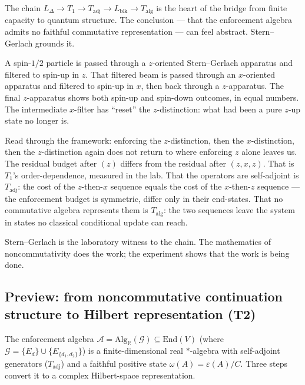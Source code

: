 \documentclass[11pt]{article}
\theoremstyle{remark}
\begin{document}
\begin{tcolorbox}[apfbox, title={The physical grounding: Stern--Gerlach and the order of enforcement}]
The chain $L_\Delta \to T_1 \to T_{\mathrm{adj}} \to L_{\mathrm{blk}} \to T_{\mathrm{alg}}$ is the heart of the bridge from finite capacity to quantum structure.  The conclusion --- that the enforcement algebra admits no faithful commutative representation --- can feel abstract.  Stern--Gerlach grounds it.

\smallskip\noindent A spin-$1/2$ particle is passed through a $z$-oriented Stern--Gerlach apparatus and filtered to spin-up in $z$.  That filtered beam is passed through an $x$-oriented apparatus and filtered to spin-up in $x$, then back through a $z$-apparatus.  The final $z$-apparatus shows both spin-up and spin-down outcomes, in equal numbers.  The intermediate $x$-filter has ``reset'' the $z$-distinction: what had been a pure $z$-up state no longer is.

\smallskip\noindent Read through the framework: enforcing the $z$-distinction, then the $x$-distinction, then the $z$-distinction again does not return to where enforcing $z$ alone leaves us.  The residual budget after $(z)$ differs from the residual after $(z, x, z)$.  That is $T_1$'s order-dependence, measured in the lab.  That the operators are self-adjoint is $T_{\mathrm{adj}}$: the cost of the $z$-then-$x$ sequence equals the cost of the $x$-then-$z$ sequence --- the enforcement budget is symmetric, differ only in their end-states.  That no commutative algebra represents them is $T_{\mathrm{alg}}$: the two sequences leave the system in states no classical conditional update can reach.

\smallskip\noindent Stern--Gerlach is the laboratory witness to the chain.  The mathematics of noncommutativity does the work; the experiment shows that the work is being done.
\end{tcolorbox}


\subsection{Preview: from noncommutative continuation structure to Hilbert representation (T2)}
\label{sec:T2}\label{sec:T2a}\label{sec:skeleton}\label{sec:T2c}

The enforcement algebra $\mathcal{A} = \mathrm{Alg}_\mathbb{R}(\mathcal{G}) \subseteq \mathrm{End}(V)$ (where $\mathcal{G} = \{E_d\} \cup \{E_{\{d_1,d_2\}}\}$) is a finite-dimensional real $*$-algebra with self-adjoint generators ($T_{\mathrm{adj}}$) and a faithful positive state $\omega(A) = \varepsilon(A)/C$.  Three steps convert it to a complex Hilbert-space representation.
\end{document}
